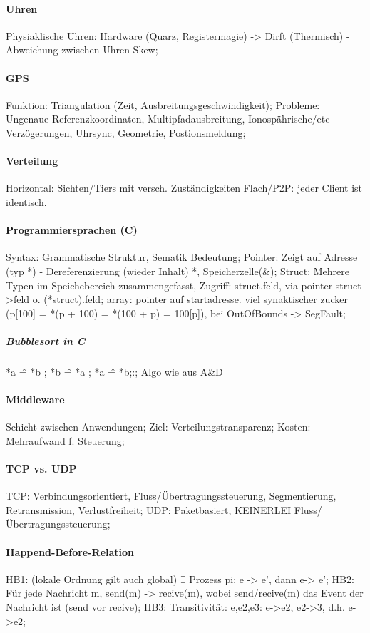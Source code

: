 \documentclass[pagesize,11pt,a4paper]{scrartcl}
\begin{document}
\paragraph*{Uhren}
	Physiaklische Uhren: Hardware (Quarz, Registermagie) -> Dirft (Thermisch) - Abweichung zwischen Uhren Skew;

\paragraph*{GPS}
	Funktion: Triangulation (Zeit, Ausbreitungsgeschwindigkeit);
	Probleme: Ungenaue Referenzkoordinaten, Multipfadausbreitung, Ionospährische/etc Verzögerungen, Uhrsync, Geometrie, Postionsmeldung;
	
\paragraph*{Verteilung}
	Horizontal: Sichten/Tiers mit versch. Zuständigkeiten
	Flach/P2P: jeder Client ist identisch.

\paragraph*{Programmiersprachen (C)}
	Syntax: Grammatische Struktur, Sematik Bedeutung;
	Pointer: Zeigt auf Adresse (typ *) - Dereferenzierung (wieder Inhalt) *, Speicherzelle(\&);
	Struct: Mehrere Typen im Speichebereich zusammengefasst, Zugriff: struct.feld, via pointer struct->feld o. (*struct).feld;
	array: pointer auf startadresse. viel synaktischer zucker (p[100] = *(p + 100) = *(100 + p) = 100[p]), bei OutOfBounds -> SegFault;

\subparagraph*{Bubblesort in C}
	*a \^= *b ; *b \^= *a ; *a \^= *b;:;
	Algo wie aus A\&D

\paragraph*{Middleware}
	Schicht zwischen Anwendungen;
	Ziel: Verteilungstransparenz;
	Kosten: Mehraufwand f. Steuerung;

\paragraph*{TCP vs. UDP}
	TCP: Verbindungsorientiert, Fluss/Übertragungssteuerung, Segmentierung, Retransmission, Verlustfreiheit;
	UDP: Paketbasiert, KEINERLEI Fluss/Übertragungssteuerung;
	
\paragraph*{Happend-Before-Relation}
	HB1: (lokale Ordnung gilt auch global) $\exists$ Prozess pi: e -> e', dann e-> e';
	HB2: Für jede Nachricht m, send(m) -> recive(m), wobei send/recive(m) das Event der Nachricht ist (send vor recive);
	HB3: Transitivität: e,e2,e3: e->e2, e2->3, d.h. e->e2;
\end{document}
